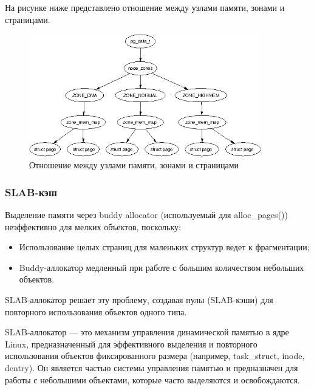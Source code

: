 На рисунке ниже представлено отношение между узлами памяти, зонами и страницами.

\begin{figure}[H]
	\centering
	\includegraphics[width=0.9\textwidth]{img/zones.png}
	\caption{Отношение между узлами памяти, зонами и страницами~\cite{pmem}}
	\label{fig:pmem}
\end{figure}

\subsubsection{SLAB-кэш}

Выделение памяти через buddy allocator (используемый для {alloc\_pages()}) неэффективно для мелких объектов, поскольку:
\begin{itemize}
    \item Использование целых страниц для маленьких структур ведет к фрагментации;
    \item Buddy-аллокатор медленный при работе с большим количеством небольших объектов.
\end{itemize}

SLAB-аллокатор решает эту проблему, создавая пулы (SLAB-кэши) для повторного использования объектов одного типа.

SLAB-аллокатор --- это механизм управления динамической памятью в ядре Linux, предназначенный для эффективного выделения и повторного использования объектов фиксированного размера (например, task\_struct, inode, dentry).
Он является частью системы управления памятью и предназначен для работы с небольшими объектами, которые часто выделяются и освобождаются.

